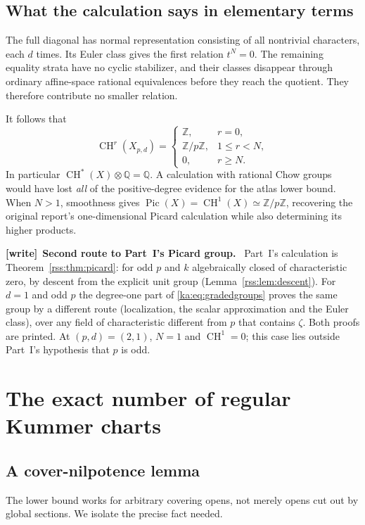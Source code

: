 \documentclass[11pt,a4paper]{article}
\theoremstyle{definition}
\theoremstyle{remark}
\newcommand{\Q}{\mathbb Q}
\newcommand{\Z}{\mathbb Z}
\newcommand{\Pic}{\operatorname{Pic}}
\newenvironment{writenote}[1][]{\par\smallskip\begingroup\small
 \noindent\textbf{[write]}\if\relax\detokenize{#1}\relax\else~\textbf{#1.}\fi\ }%
 {\par\endgroup\smallskip}
\newcommand{\CH}{\operatorname{CH}}
\begin{document}
\subsection{What the calculation says in elementary terms}
The full diagonal has normal representation consisting of all nontrivial
characters, each $d$ times. Its Euler class gives the first relation
$t^N=0$. The remaining equality strata have no cyclic stabilizer, and
their classes disappear through ordinary affine-space rational
equivalences before they reach the quotient. They therefore contribute
no smaller relation.

It follows that
\begin{equation}
 \CH^r(X_{p,d})=
 \begin{cases}
  \Z,&r=0,\\
  \Z/p\Z,&1\leq r<N,\\
  0,&r\geq N.
 \end{cases}
 \label{ka:eq:gradedgroups}
\end{equation}
In particular $\CH^*(X)\otimes\Q=\Q$. A calculation with rational
Chow groups would have lost \emph{all} of the positive-degree evidence
for the atlas lower bound. When $N>1$, smoothness gives
$\Pic(X)=\CH^1(X)\simeq\Z/p\Z$, recovering the original report's
one-dimensional Picard calculation while also determining its higher
products.

\begin{writenote}[Second route to Part~I's Picard group]
Part~I's calculation is Theorem~\ref{rss:thm:picard}: for odd $p$ and $k$
algebraically closed of characteristic zero, by descent from the explicit
unit group (Lemma~\ref{rss:lem:descent}). For $d=1$ and odd $p$ the degree-one
part of \eqref{ka:eq:gradedgroups} proves the same group by a different
route (localization, the scalar approximation and the Euler class), over any
field of characteristic different from $p$ that contains $\zeta$. Both proofs
are printed. At $(p,d)=(2,1)$, $N=1$ and $\CH^1=0$; this case lies outside
Part~I's hypothesis that $p$ is odd.
\end{writenote}

\section{The exact number of regular Kummer charts}
\label{ka:sec:minimum}

\subsection{A cover-nilpotence lemma}
The lower bound works for arbitrary covering opens, not merely opens
cut out by global sections. We isolate the precise fact needed.
\end{document}
